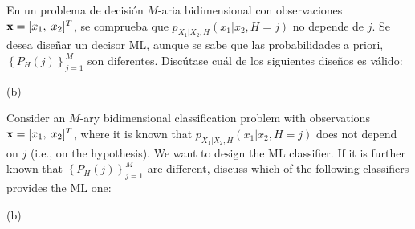 \ifspanish

\question En un problema de decisión $M$-aria bidimensional con observaciones ${\bf x}=[x_1, \; x_2]^T$, se comprueba que $p_{X_1|X_2,H}(x_1|x_2,H=j)$ no depende de $j$. Se desea dise\~{n}ar un decisor ML, aunque se sabe que las probabilidades a priori, $ \left\lbrace P_H(j) \right\rbrace_{j=1}^M$ son diferentes. Discútase cuál de los siguientes dise\~{n}os es válido:

\begin{solution} (b)
\end{solution}

\else

\question Consider an $M$-ary bidimensional classification problem with observations ${\bf x}=[x_1, \; x_2]^T$, where it is known that $p_{X_1|X_2,H}(x_1|x_2,H=j)$ does not depend on $j$ (i.e., on the hypothesis). We want to design the ML classifier.  If it is further known that $ \left\lbrace P_H(j) \right\rbrace_{j=1}^M$ are different, discuss which of the following classifiers provides the ML one:

\begin{solution} (b) \end{solution}

\fi